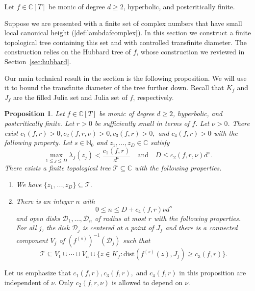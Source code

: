\documentclass[12pt,oneside,a4]{amsart}
\newcommand{\IC}{\mathbb{C}}
\newcommand{\IN}{\mathbb{N}}
\renewcommand{\cD}{\mathcal{D}}
\newcommand{\cT}{\mathcal{T}}
\newcounter{maincounter}
\numberwithin{maincounter}{section}
\numberwithin{equation}{section}
\newtheorem{proposition}[maincounter]{Proposition}
\renewcommand{\subset}{\subseteq}
\begin{document}
Let $f\in \IC[T]$ be monic of degree $d\ge 2$, hyperbolic, and postcritically
finite.

Suppose we are presented with a finite set of complex numbers that have
small local canonical height (\ref{def:lambdafcomplex}). In this section we
construct a finite topological tree containing this set and with
controlled transfinite diameter. The construction relies on the
Hubbard tree of $f$, whose construction we reviewed in
Section~\ref{sec:hubbard}.

Our main technical result in the section is the following proposition.
We will use it to bound the transfinite diameter
of the tree further
down. Recall that $K_f$ and $J_f$ are the filled Julia set and
Julia set of $f$, respectively. 

\begin{proposition}
  \label{prop:growtree}
  Let $f\in \IC[T]$ be monic of degree $d\ge 2$, hyperbolic, and
  postcritically finite. Let $r > 0$ be sufficiently small in
  terms of $f$. Let $\nu>0$. There exist
  $c_{1}(f,r)>0,c_2(f,r,\nu)>0,c_3(f,r)>0,$ and
  $c_4(f,r)>0$ with the following property. Let $s\in\IN_0$ and
  $z_1,\ldots,z_D\in \IC$ satisfy
  \begin{equation}
    \label{eq:propDdshypo}
    \max_{1\le j\le D} \lambda_f(z_j) < \frac{c_1(f,r)}{d^s}
    \quad\text{and}\quad D\le c_2(f,r,\nu) d^s. 
  \end{equation}
  There exists a finite topological tree $\cT\subset\IC$ with the
  following properties.
  \begin{enumerate}
  \item[(i)] We have $\{z_1,\ldots,z_D\}\subset \cT$.
  \item[(ii)]
    There is an integer $n$ with
    \begin{equation*}
      0 \le n \le D+c_4(f,r) \nu d^s
    \end{equation*}
    and open disks $\cD_1,\ldots,\cD_n$ of radius at most
    $r$ with the following properties.
    For all $j$, the disk $\cD_j$ is centered at a point of $J_f$ and
    there is a
    connected component $V_j$ of $(f^{(s)})^{-1}(\cD_j)$ such that
    \begin{equation*}
      \cT \subset V_1\cup\cdots\cup V_n \cup \{z\in K_f :
      \mathrm{dist}(f^{(s)}(z),J_f) \ge c_3(f,r)\}.
    \end{equation*}   
  \end{enumerate}
\end{proposition}

Let us emphasize that $c_1(f,r), c_3(f,r),$ and $c_4(f,r)$ in this
proposition are independent of $\nu$. Only $c_2(f,r,\nu)$ is allowed
to depend on $\nu$. 
\end{document}
